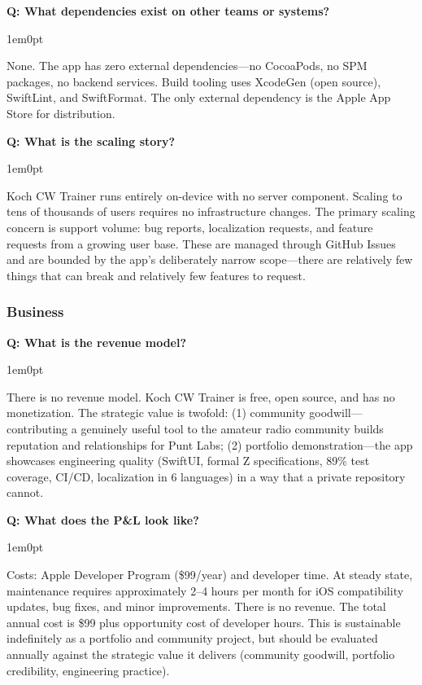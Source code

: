 \documentclass[11pt,letterpaper]{article}
\newenvironment{faqpair}[1]{%
  \vspace{0.5em}%
  \noindent\textbf{\color{SectionBlue}Q: #1}\par%
  \vspace{0.2em}%
  \begin{adjustwidth}{1em}{0pt}%
  \setlength{\parindent}{0pt}%
}{%
  \end{adjustwidth}%
  \vspace{0.5em}%
}
\begin{document}
\begin{faqpair}{What dependencies exist on other teams or systems?}
  None. The app has zero external dependencies---no CocoaPods, no SPM packages, no backend services. Build tooling uses XcodeGen (open source), SwiftLint, and SwiftFormat. The only external dependency is the Apple App Store for distribution.
\end{faqpair}

\begin{faqpair}{What is the scaling story?}
  Koch CW Trainer runs entirely on-device with no server component. Scaling to tens of thousands of users requires no infrastructure changes. The primary scaling concern is support volume: bug reports, localization requests, and feature requests from a growing user base. These are managed through GitHub Issues and are bounded by the app's deliberately narrow scope---there are relatively few things that can break and relatively few features to request.
\end{faqpair}

\subsubsection*{Business}

\begin{faqpair}{What is the revenue model?}
  There is no revenue model. Koch CW Trainer is free, open source, and has no monetization. The strategic value is twofold: (1) community goodwill---contributing a genuinely useful tool to the amateur radio community builds reputation and relationships for Punt Labs; (2) portfolio demonstration---the app showcases engineering quality (SwiftUI, formal Z specifications, 89\% test coverage, CI/CD, localization in 6 languages) in a way that a private repository cannot.
\end{faqpair}

\begin{faqpair}{What does the P\&L look like?}
  Costs: Apple Developer Program (\$99/year) and developer time. At steady state, maintenance requires approximately 2--4 hours per month for iOS compatibility updates, bug fixes, and minor improvements. There is no revenue. The total annual cost is \$99 plus opportunity cost of developer hours. This is sustainable indefinitely as a portfolio and community project, but should be evaluated annually against the strategic value it delivers (community goodwill, portfolio credibility, engineering practice).
\end{faqpair}
\end{document}

